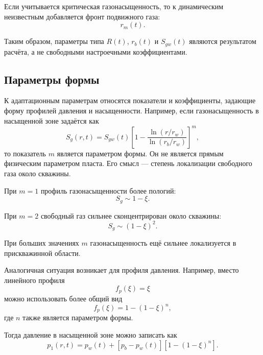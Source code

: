 \documentclass[12pt,a4paper]{article}
\begin{document}
Если учитывается критическая газонасыщенность, то к динамическим неизвестным добавляется фронт подвижного газа:
\begin{equation}
    r_m(t).
\end{equation}

Таким образом, параметры типа $R(t)$, $r_b(t)$ и $S_{gw}(t)$ являются результатом расчёта, а не свободными настроечными коэффициентами.

\subsection{Параметры формы}

К адаптационным параметрам относятся показатели и коэффициенты, задающие форму профилей давления и насыщенности. Например, если газонасыщенность в насыщенной зоне задаётся как
\begin{equation}
    S_g(r,t)=S_{gw}(t)
    \left[
        1-
        \frac{\ln(r/r_w)}{\ln(r_b/r_w)}
    \right]^m,
\end{equation}
то показатель $m$ является параметром формы. Он не является прямым физическим параметром пласта. Его смысл --- степень локализации свободного газа около скважины.

При $m=1$ профиль газонасыщенности более пологий:
\begin{equation}
    S_g \sim 1-\xi.
\end{equation}

При $m=2$ свободный газ сильнее сконцентрирован около скважины:
\begin{equation}
    S_g \sim (1-\xi)^2.
\end{equation}

При больших значениях $m$ газонасыщенность ещё сильнее локализуется в прискважинной области.

Аналогичная ситуация возникает для профиля давления. Например, вместо линейного профиля
\begin{equation}
    f_p(\xi)=\xi
\end{equation}
можно использовать более общий вид
\begin{equation}
    f_p(\xi)=1-(1-\xi)^n,
\end{equation}
где $n$ также является параметром формы.

Тогда давление в насыщенной зоне можно записать как
\begin{equation}
    p_1(r,t)
    =
    p_w(t)+\left[p_b-p_w(t)\right]
    \left[1-(1-\xi)^n\right].
\end{equation}
\end{document}
